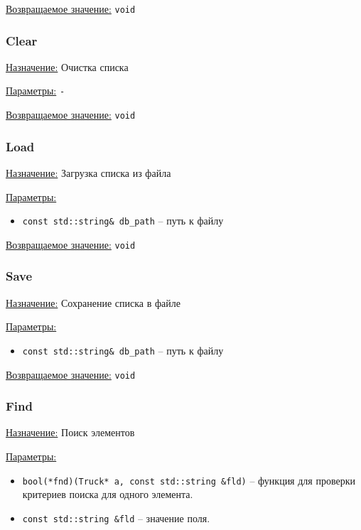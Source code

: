 \underline{Возвращаемое значение:} \verb|void|


\subsubsection*{Clear}

\underline{Назначение:} Очистка списка

\underline{Параметры:} \verb|-|

\underline{Возвращаемое значение:} \verb|void|


\subsubsection*{Load}

\underline{Назначение:} Загрузка списка из файла

\underline{Параметры:} 

\begin{itemize}
    \item \verb|const std::string& db_path| -- путь к файлу
\end{itemize}

\underline{Возвращаемое значение:} \verb|void|


\subsubsection*{Save}

\underline{Назначение:} Сохранение списка в файле

\underline{Параметры:} 

\begin{itemize}
    \item \verb|const std::string& db_path| -- путь к файлу
\end{itemize}

\underline{Возвращаемое значение:} \verb|void|


\subsubsection*{Find}

\underline{Назначение:} Поиск элементов

\underline{Параметры:} 

\begin{itemize}
    \item \verb|bool(*fnd)(Truck* a, const std::string &fld)| -- функция для проверки критериев поиска для одного элемента.
    \item \verb|const std::string &fld| -- значение поля.
\end{itemize}

